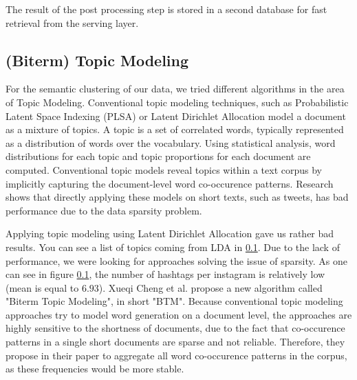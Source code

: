 The result of the post processing step is stored in a second database for fast retrieval from the serving layer.

\subsection{(Biterm) Topic Modeling}

For the semantic clustering of our data, we tried different algorithms in the area of Topic Modeling. Conventional topic modeling techniques, such as Probabilistic Latent Space Indexing (PLSA) \cite{Hofmann99probabilisticlatent} or Latent Dirichlet Allocation \cite{lda} model a document as a mixture of topics. A topic is a set of correlated words, typically represented as a distribution of words over the vocabulary. Using statistical analysis, word distributions for each topic and topic proportions for each document are computed. Conventional topic models reveal topics within a text corpus by implicitly capturing the document-level word co-occurence patterns. Research shows \cite{btm} that directly applying these models on short texts, such as tweets, has bad performance due to the data sparsity problem.

Applying topic modeling using Latent Dirichlet Allocation gave us rather bad results. You can see a list of topics coming from LDA in \ref{}. Due to the lack of performance, we were looking for approaches solving the issue of sparsity. As one can see in figure \ref{}, the number of hashtags per instagram is relatively low (mean is equal to $6.93$). Xueqi Cheng et al. \cite{btm} propose a new algorithm called "Biterm Topic Modeling", in short "BTM". Because conventional topic modeling approaches try to model word generation on a document level, the approaches are highly sensitive to the shortness of documents, due to the fact that co-occurence patterns in a single short documents are sparse and not reliable. Therefore, they propose in their paper to aggregate all word co-occurence patterns in the corpus, as these frequencies would be more stable.


